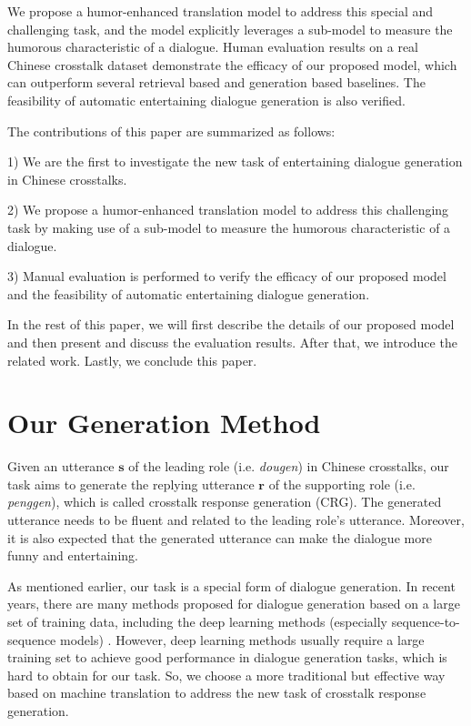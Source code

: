 \documentclass[letterpaper]{article} %
\begin{document}
\begin{CJK*}{UTF8}{gbsn}
We propose a humor-enhanced translation model to address this special and challenging task, and the model explicitly leverages a sub-model to measure the humorous characteristic of a dialogue. Human evaluation results on a real Chinese crosstalk dataset demonstrate the efficacy of our proposed model, which can outperform several retrieval based and generation based baselines. The feasibility of automatic entertaining dialogue generation is also verified. 

The contributions of this paper are summarized as follows:

1) We are the first to investigate the new task of entertaining dialogue generation in Chinese crosstalks. 

2) We propose a humor-enhanced translation model to address this challenging task by making use of a sub-model to measure the humorous characteristic of a dialogue.

3) Manual evaluation is performed to verify the efficacy of our proposed model and the feasibility of automatic entertaining dialogue generation.

In the rest of this paper, we will first describe the details of our proposed model and then present and discuss the evaluation results. After that, we introduce the related work. Lastly, we conclude this paper. 

\section{Our Generation Method}

Given an utterance  $\mathbf{s}$ of the leading role (i.e. \textit{dougen}) in Chinese crosstalks, our task aims to generate the replying utterance $\mathbf{r}$ of the supporting role (i.e. {\it penggen}), which is called crosstalk response generation (CRG). The generated utterance needs to be fluent and related to the leading role's utterance. Moreover, it is also expected that the generated utterance can make the dialogue more funny and entertaining.  

As mentioned earlier, our task is a special form of dialogue generation. In recent years, there are many methods proposed for dialogue generation based on a large set of training data, including the deep learning methods (especially sequence-to-sequence models) \cite{li-EtAl:2016:EMNLP20162}. However, deep learning methods usually require a large training set to achieve good performance in dialogue generation tasks, which is hard to obtain for our task. So, we choose a more traditional but effective way based on machine translation to address the new task of crosstalk response generation.


\end{CJK*}
\end{document}

